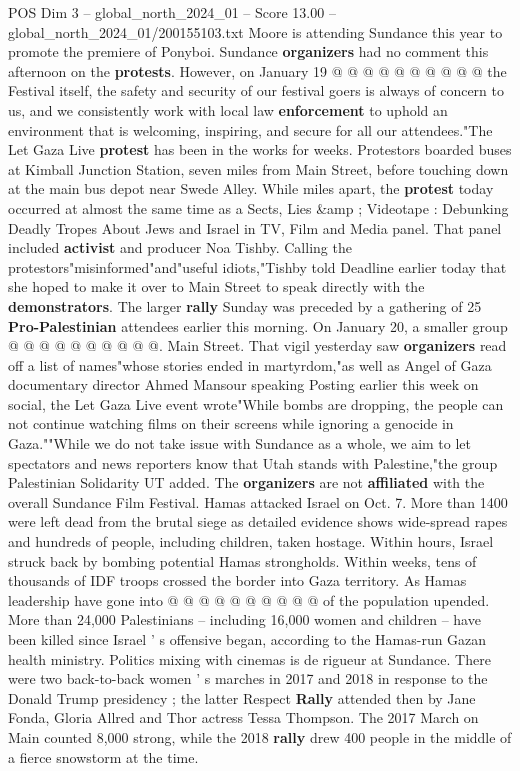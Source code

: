 \begin{textsample}{POS Dim 3 – global\_north\_2024\_01 – Score 13.00 – global\_north\_2024\_01/200155103.txt}
Moore is attending Sundance this year to promote the premiere of Ponyboi.
Sundance \textbf{organizers} had no comment this afternoon on the \textbf{protests}.
However, on January 19 @ @ @ @ @ @ @ @ @ @ the Festival itself, the safety and security of our festival goers is always of concern to us, and we consistently work with local law \textbf{enforcement} to uphold an environment that is welcoming, inspiring, and secure for all our attendees."The Let Gaza Live \textbf{protest} has been in the works for weeks.
Protestors boarded buses at Kimball Junction Station, seven miles from Main Street, before touching down at the main bus depot near Swede Alley.
While miles apart, the \textbf{protest} today occurred at almost the same time as a Sects, Lies \&amp ; Videotape : Debunking Deadly Tropes About Jews and Israel in TV, Film and Media panel.
That panel included \textbf{activist} and producer Noa Tishby.
Calling the protestors"misinformed"and"useful idiots,"Tishby told Deadline earlier today that she hoped to make it over to Main Street to speak directly with the \textbf{demonstrators}.
The larger \textbf{rally} Sunday was preceded by a gathering of 25 \textbf{Pro-Palestinian} attendees earlier this morning.
On January 20, a smaller group @ @ @ @ @ @ @ @ @ @.
Main Street.
That vigil yesterday saw \textbf{organizers} read off a list of names"whose stories ended in martyrdom,"as well as Angel of Gaza documentary director Ahmed Mansour speaking Posting earlier this week on social, the Let Gaza Live event wrote"While bombs are dropping, the people can not continue watching films on their screens while ignoring a genocide in Gaza.""While we do not take issue with Sundance as a whole, we aim to let spectators and news reporters know that Utah stands with Palestine,"the group Palestinian Solidarity UT added.
The \textbf{organizers} are not \textbf{affiliated} with the overall Sundance Film Festival.
Hamas attacked Israel on Oct. 7.
More than 1400 were left dead from the brutal siege as detailed evidence shows wide-spread rapes and hundreds of people, including children, taken hostage.
Within hours, Israel struck back by bombing potential Hamas strongholds.
Within weeks, tens of thousands of IDF troops crossed the border into Gaza territory.
As Hamas leadership have gone into @ @ @ @ @ @ @ @ @ @ of the population upended.
More than 24,000 Palestinians -- including 16,000 women and children -- have been killed since Israel ' s offensive began, according to the Hamas-run Gazan health ministry.
Politics mixing with cinemas is de rigueur at Sundance.
There were two back-to-back women ' s marches in 2017 and 2018 in response to the Donald Trump presidency ; the latter Respect \textbf{Rally} attended then by Jane Fonda, Gloria Allred and Thor actress Tessa Thompson.
The 2017 March on Main counted 8,000 strong, while the 2018 \textbf{rally} drew 400 people in the middle of a fierce snowstorm at the time.

\end{textsample}
